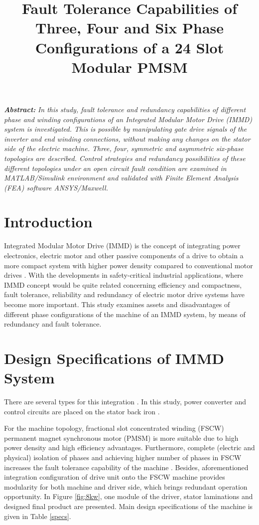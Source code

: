 \documentclass[a4paper,11pt]{article}
\title{\normalsize\textbf{Fault Tolerance Capabilities of Three, Four and Six Phase Configurations of a 24 Slot Modular PMSM}}
\date{}
\begin{document}
\vspace{-45mm}
\maketitle
\vspace{-23mm}

\textit{\normalsize\textbf{Abstract:}}
\textit{In this study, fault tolerance and redundancy capabilities of different phase and winding configurations of an Integrated Modular Motor Drive (IMMD) system is investigated. This is possible by manipulating gate drive signals of the inverter and end winding connections, without making any changes on the stator side of the electric machine. Three, four, symmetric and asymmetric six-phase topologies are described. Control strategies and redundancy possibilities of these different topologies under an open circuit fault condition are examined in MATLAB/Simulink environment and validated with Finite Element Analysis (FEA) software ANSYS/Maxwell. }

\section{\normalsize\textbf{Introduction}}
Integrated Modular Motor Drive (IMMD) is the concept of integrating power electronics, electric motor and other passive components of a drive to obtain a more compact system with higher power density compared to conventional motor drives \cite{immd-bible}. With the developments in safety-critical industrial applications, where IMMD concept would be quite related concerning efficiency and compactness, fault tolerance, reliability and redundancy of electric motor drive systems have become more important. This study examines assets and disadvantages of different phase configurations of the machine of an IMMD system, by means of redundancy and fault tolerance. 

\section{\normalsize\textbf{Design Specifications of IMMD System}}
There are several types for this integration \cite{difftopology1}\cite{difftopology2}. In this study, power converter and control circuits are placed on the stator back iron \cite{mesutto}. \par
For the machine topology, fractional slot concentrated winding (FSCW) permanent magnet synchronous motor (PMSM) is more suitable due to high power density and high efficiency advantages. Furthermore, complete (electric and physical) isolation of phases and achieving higher number of phases in FSCW increases the fault tolerance capability of the machine \cite{fscw}. Besides, aforementioned integration configuration of drive unit onto the FSCW machine provides modularity for both machine and driver side, which brings redundant operation opportunity. In Figure \ref{fig:8kw}, one module of the driver, stator laminations and designed final product are presented. Main design specifications of the machine is given in Table \ref{specs}.
\end{document}
